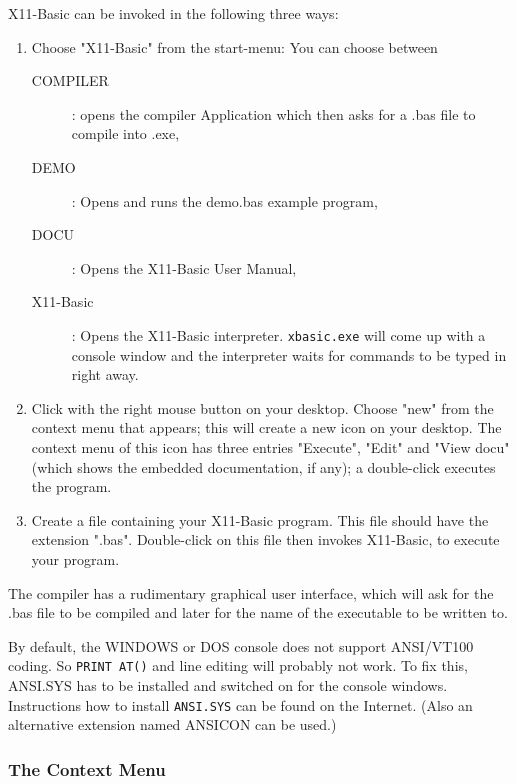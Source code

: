 X11-Basic can be invoked in the following three ways:

\begin{enumerate}
\item Choose "X11-Basic" from the start-menu: You can choose between 
\begin{description}
\item[COMPILER]: opens the compiler Application which then asks for a .bas file to compile into .exe,
\item[DEMO]: Opens and runs the demo.bas example program,
\item[DOCU]: Opens the X11-Basic User Manual,
\item[X11-Basic]: Opens the X11-Basic interpreter. \verb|xbasic.exe| will come 
up with a console window and the interpreter waits for commands to be typed
in right away.
\end{description}
\item Click with the right mouse button on your desktop. Choose "new" from the 
      context menu that appears; this will create a new icon on your desktop. 
      The context menu of this icon has three entries "Execute", "Edit" and   
      "View docu" (which shows the embedded documentation, if any); a         
      double-click executes the program.
\item Create a file containing your X11-Basic program. This file should have    
      the extension ".bas". Double-click on this file then invokes X11-Basic,   
      to execute your program. 
\end{enumerate}

The compiler has a rudimentary graphical user interface, which will ask for 
the .bas file to be compiled and later for the name of the executable to be 
written to.

By default, the WINDOWS or DOS console does not support ANSI/VT100 coding.  So
\verb|PRINT AT()| and line editing will probably not work. To fix this,
ANSI.SYS  has to be installed and switched on for the console windows.
Instructions how to install \verb|ANSI.SYS| can be found on the Internet. 
(Also an alternative extension named ANSICON can be used.)

\subsubsection*{The Context Menu}


